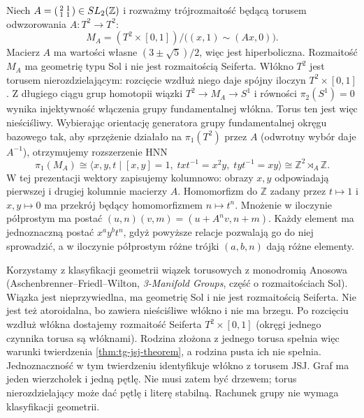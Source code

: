 \begin{przyklad}
\label{ex:tg-jsj-sol-torus-bundle}
Niech
$A=\begin{psmallmatrix}2&1\\1&1\end{psmallmatrix}
\in SL_2(\mathbb Z)$ i rozważmy
trójrozmaitość będącą torusem odwzorowania
$A\colon T^2\to T^2$:
\[
M_A=(T^2\times[0,1])/
\bigl((x,1)\sim(Ax,0)\bigr).
\]
Macierz $A$ ma wartości własne
$(3\pm\sqrt5)/2$, więc jest
hiperboliczna. Rozmaitość $M_A$
ma geometrię typu Sol i
nie jest rozmaitością Seiferta.
Włókno $T^2$ jest torusem nierozdzielającym:
rozcięcie wzdłuż niego daje spójny iloczyn
$T^2\times[0,1]$. Z długiego ciągu grup homotopii
wiązki $T^2\to M_A\to S^1$ i równości
$\pi_2(S^1)=0$ wynika injektywność włączenia
grupy fundamentalnej włókna.
Torus ten jest więc nieściśliwy.
Wybierając orientację generatora grupy
fundamentalnej okręgu bazowego tak,
aby sprzężenie działało na $\pi_1(T^2)$
przez $A$ (odwrotny wybór daje $A^{-1}$),
otrzymujemy rozszerzenie HNN
\[
\pi_1(M_A)\cong
\langle x,y,t\mid
[x,y]=1,\;
txt^{-1}=x^2y,\;
tyt^{-1}=xy\rangle
\cong\mathbb Z^2\rtimes_A\mathbb Z.
\]
W tej prezentacji wektory zapisujemy kolumnowo:
obrazy $x,y$ odpowiadają pierwszej i drugiej
kolumnie macierzy $A$. Homomorfizm do
$\mathbb Z$ zadany przez $t\mapsto1$ i
$x,y\mapsto0$ ma przekrój będący homomorfizmem
$n\mapsto t^n$. Mnożenie w iloczynie półprostym
ma postać $(u,n)(v,m)=(u+A^nv,n+m)$.
Każdy element ma jednoznaczną postać $x^a y^b t^n$,
gdyż powyższe relacje pozwalają go do niej sprowadzić,
a w iloczynie półprostym różne trójki $(a,b,n)$
dają różne elementy.

Korzystamy z klasyfikacji geometrii wiązek torusowych
z monodromią Anosowa (Aschenbrenner--Friedl--Wilton,
\emph{3-Manifold Groups}, część o rozmaitościach Sol).
Wiązka jest nieprzywiedlna, ma geometrię Sol
i nie jest rozmaitością Seiferta. Nie jest też
atoroidalna, bo zawiera nieściśliwe włókno i nie ma
brzegu. Po rozcięciu wzdłuż włókna dostajemy
rozmaitość Seiferta $T^2\times[0,1]$ (okręgi
jednego czynnika torusa są włóknami).
Rodzina złożona z jednego torusa spełnia więc
warunki twierdzenia \ref{thm:tg-jsj-theorem},
a rodzina pusta ich nie spełnia. Jednoznaczność
w tym twierdzeniu identyfikuje włókno z torusem JSJ.
Graf ma jeden wierzchołek i jedną pętlę.
Nie musi zatem być drzewem; torus nierozdzielający
może dać pętlę i literę stabilną. Rachunek grupy
nie wymaga klasyfikacji geometrii.
\end{przyklad}

